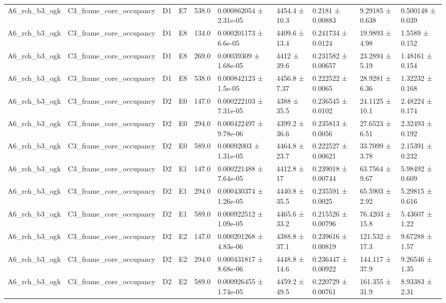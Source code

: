 \begin{table}
\begin{tabular}{llllllllll}
A6\_rch\_b3\_ogk & C3\_frame\_core\_occupancy & D1 & E7 & 538.0 & 0.000862054 ± 2.31e-05 & 4454.4 ± 10.3 & 0.2181 ± 0.00883 & 9.29185 ± 0.638 & 0.500148 ± 0.039 \\
A6\_rch\_b3\_ogk & C3\_frame\_core\_occupancy & D1 & E8 & 134.0 & 0.000201173 ± 6.6e-05 & 4409.6 ± 13.4 & 0.241734 ± 0.0124 & 19.9893 ± 4.98 & 1.5589 ± 0.152 \\
A6\_rch\_b3\_ogk & C3\_frame\_core\_occupancy & D1 & E8 & 269.0 & 0.00039309 ± 1.68e-05 & 4412 ± 39.6 & 0.231582 ± 0.00657 & 23.2894 ± 5.19 & 1.48161 ± 0.154 \\
A6\_rch\_b3\_ogk & C3\_frame\_core\_occupancy & D1 & E8 & 538.0 & 0.000842123 ± 1.5e-05 & 4456.8 ± 7.37 & 0.222522 ± 0.0065 & 28.9281 ± 6.36 & 1.32232 ± 0.168 \\
A6\_rch\_b3\_ogk & C3\_frame\_core\_occupancy & D2 & E0 & 147.0 & 0.000222103 ± 7.31e-05 & 4388 ± 35.5 & 0.236545 ± 0.0102 & 24.1125 ± 10.1 & 2.48224 ± 0.174 \\
A6\_rch\_b3\_ogk & C3\_frame\_core\_occupancy & D2 & E0 & 294.0 & 0.000422497 ± 9.78e-06 & 4399.2 ± 36.6 & 0.235813 ± 0.0056 & 27.6523 ± 6.51 & 2.32493 ± 0.192 \\
A6\_rch\_b3\_ogk & C3\_frame\_core\_occupancy & D2 & E0 & 589.0 & 0.00092003 ± 1.31e-05 & 4464.8 ± 23.7 & 0.222527 ± 0.00621 & 33.7099 ± 3.78 & 2.15391 ± 0.232 \\
A6\_rch\_b3\_ogk & C3\_frame\_core\_occupancy & D2 & E1 & 147.0 & 0.000221488 ± 7.64e-05 & 4412.8 ± 17 & 0.239018 ± 0.00744 & 63.7564 ± 9.67 & 5.98492 ± 0.609 \\
A6\_rch\_b3\_ogk & C3\_frame\_core\_occupancy & D2 & E1 & 294.0 & 0.000430374 ± 1.26e-05 & 4440.8 ± 35.5 & 0.235591 ± 0.0025 & 65.5903 ± 2.92 & 5.29815 ± 0.616 \\
A6\_rch\_b3\_ogk & C3\_frame\_core\_occupancy & D2 & E1 & 589.0 & 0.000922512 ± 1.09e-05 & 4465.6 ± 33.2 & 0.215526 ± 0.00796 & 76.4203 ± 15.8 & 5.43607 ± 1.22 \\
A6\_rch\_b3\_ogk & C3\_frame\_core\_occupancy & D2 & E2 & 147.0 & 0.000201268 ± 4.83e-06 & 4388.8 ± 37.1 & 0.239616 ± 0.00819 & 121.532 ± 17.3 & 9.67288 ± 1.57 \\
A6\_rch\_b3\_ogk & C3\_frame\_core\_occupancy & D2 & E2 & 294.0 & 0.000431817 ± 8.68e-06 & 4448.8 ± 14.6 & 0.236447 ± 0.00922 & 144.117 ± 37.9 & 9.26546 ± 1.35 \\
A6\_rch\_b3\_ogk & C3\_frame\_core\_occupancy & D2 & E2 & 589.0 & 0.000926455 ± 1.74e-05 & 4459.2 ± 49.5 & 0.220729 ± 0.00761 & 161.355 ± 31.9 & 8.93383 ± 2.31 \\

\end{tabular}
\end{table}
